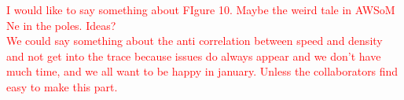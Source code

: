 \documentclass[namedreferences]{solarphysics}
\def\diego#1{\textcolor{red}{#1}}
\begin{document}
\begin{article}
\diego{I would like to say something about FIgure 10. Maybe the weird tale in AWSoM Ne in the poles. Ideas?}\\

\diego{We could say something about the anti correlation between speed and density and not get into the trace because issues do always appear and we don't have much time, and we all want to be happy in january. Unless the collaborators find easy to make this part.}

%



%
  

%



%
%


%
%

  
%
%
%   
%  

\end{article} 
\end{document}
